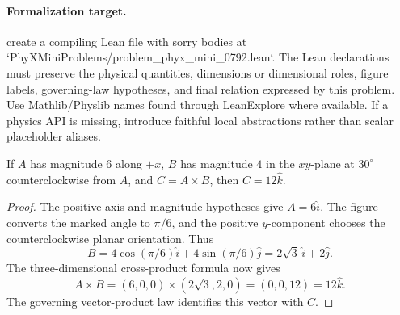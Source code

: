 \paragraph{Formalization target.}
create a compiling Lean file with sorry bodies at `PhyXMiniProblems/problem\_phyx\_mini\_0792.lean`. The Lean declarations must preserve the physical quantities, dimensions or dimensional roles, figure labels, governing-law hypotheses, and final relation expressed by this problem.
Use Mathlib/Physlib names found through LeanExplore where available. If a physics API is missing, introduce faithful local abstractions rather than scalar placeholder aliases.

\begin{theorem}
\label{thm:physics:phyx_mini_0792:target}
If \(A\) has magnitude \(6\) along \(+x\), \(B\) has magnitude \(4\) in the
\(xy\)-plane at \(30^\circ\) counterclockwise from \(A\), and
\(C=A\times B\), then \(C=12\widehat{k}\).
\end{theorem}
\begin{proof}
The positive-axis and magnitude hypotheses give \(A=6\widehat{i}\).  The
figure converts the marked angle to \(\pi/6\), and the positive \(y\)-component
chooses the counterclockwise planar orientation.  Thus
\[
 B=4\cos(\pi/6)\widehat{i}+4\sin(\pi/6)\widehat{j}
   =2\sqrt3\,\widehat{i}+2\widehat{j}.
\]
The three-dimensional cross-product formula now gives
\[
 A\times B
 =(6,0,0)\times(2\sqrt3,2,0)=(0,0,12)
 =12\widehat{k}.
\]
The governing vector-product law identifies this vector with \(C\).
\end{proof}


